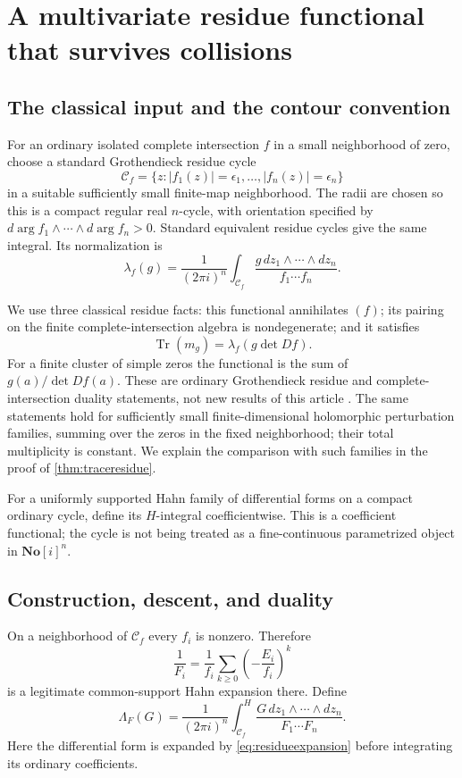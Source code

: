 \documentclass[11pt]{article}
\theoremstyle{definition}
\newcommand{\SC}{\mathbf{No}[i]}
\newcommand{\Tr}{\operatorname{Tr}}
\newcommand{\HInt}{\mathop{\int}\nolimits^{\!H}}
\begin{document}
\section{A multivariate residue functional that survives collisions}\label{sec:residues}
\subsection{The classical input and the contour convention}
For an ordinary isolated complete intersection $f$ in a small neighborhood of zero, choose a standard Grothendieck residue cycle
\[
 \mathcal C_f=\{z:|f_1(z)|=\epsilon_1,\ldots,
                    |f_n(z)|=\epsilon_n\}
\]
in a suitable sufficiently small finite-map neighborhood. The radii are chosen so this is a compact regular real $n$-cycle, with orientation specified by
$d\arg f_1\wedge\cdots\wedge d\arg f_n>0$. Standard equivalent residue cycles give the same integral. Its normalization is
\begin{equation}\label{eq:classicalresidue}
 \lambda_f(g)=\frac1{(2\pi i)^n}
 \int_{\mathcal C_f}\frac{g\,dz_1\wedge\cdots\wedge dz_n}
                            {f_1\cdots f_n}.
\end{equation}

We use three classical residue facts: this functional annihilates $(f)$; its pairing on the finite complete-intersection algebra is nondegenerate; and it satisfies
\[
 \Tr(m_g)=\lambda_f(g\det Df).
\]
For a finite cluster of simple zeros the functional is the sum of $g(a)/\det Df(a)$. These are ordinary Grothendieck residue and complete-intersection duality statements, not new results of this article \cite[Chapter 5]{GH}\cite{SS}. The same statements hold for sufficiently small finite-dimensional holomorphic perturbation families, summing over the zeros in the fixed neighborhood; their total multiplicity is constant. We explain the comparison with such families in the proof of \cref{thm:traceresidue}.

For a uniformly supported Hahn family of differential forms on a compact ordinary cycle, define its $H$-integral coefficientwise. This is a coefficient functional; the cycle is not being treated as a fine-continuous parametrized object in $\SC^n$.

\subsection{Construction, descent, and duality}
On a neighborhood of $\mathcal C_f$ every $f_i$ is nonzero. Therefore
\begin{equation}\label{eq:residueexpansion}
 \frac1{F_i}=\frac1{f_i}\sum_{k\ge0}
          \left(-\frac{E_i}{f_i}\right)^k
\end{equation}
is a legitimate common-support Hahn expansion there. Define
\begin{equation}\label{eq:hahnresidue}
 \Lambda_F(G)=\frac1{(2\pi i)^n}
 \HInt_{\mathcal C_f}\frac{G\,dz_1\wedge\cdots\wedge dz_n}
                              {F_1\cdots F_n}.
\end{equation}
Here the differential form is expanded by \eqref{eq:residueexpansion} before integrating its ordinary coefficients.
\end{document}

